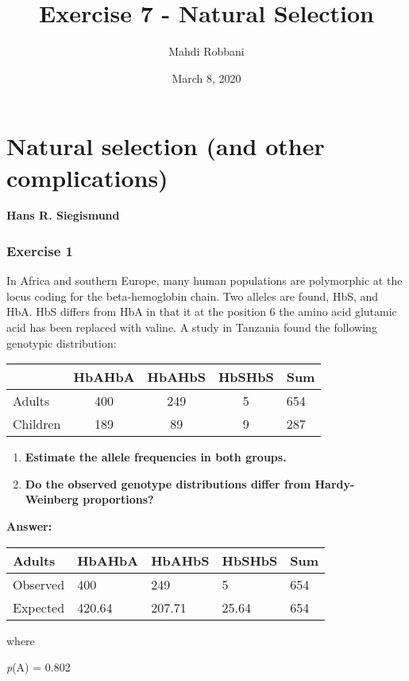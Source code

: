 \documentclass[]{article}
\title{Exercise 7 - Natural Selection}
\author{Mahdi Robbani}
\date{March 8, 2020}
\begin{document}
\maketitle

\hypertarget{natural-selection-and-other-complications}{%
\section{Natural selection (and other
complications)}\label{natural-selection-and-other-complications}}

\textbf{Hans R. Siegismund}

\hypertarget{exercise-1}{%
\subsubsection{Exercise 1}\label{exercise-1}}

In Africa and southern Europe, many human populations are polymorphic at
the locus coding for the beta-hemoglobin chain. Two alleles are found,
HbS, and HbA. HbS differs from HbA in that it at the position 6 the
amino acid glutamic acid has been replaced with valine. A study in
Tanzania found the following genotypic distribution:

\begin{longtable}[]{@{}lcccl@{}}
\toprule
& HbAHbA & HbAHbS & HbSHbS & Sum\tabularnewline
\midrule
\endhead
Adults & 400 & 249 & 5 & 654\tabularnewline
Children & 189 & 89 & 9 & 287\tabularnewline
\bottomrule
\end{longtable}

\begin{enumerate}
\def\labelenumi{\arabic{enumi})}
\item
  \textbf{Estimate the allele frequencies in both groups.}
\item
  \textbf{Do the observed genotype distributions differ from
  Hardy-Weinberg proportions?}
\end{enumerate}

\textbf{Answer:}

\begin{longtable}[]{@{}lllll@{}}
\toprule
Adults & HbAHbA & HbAHbS & HbSHbS & Sum\tabularnewline
\midrule
\endhead
Observed & 400 & 249 & 5 & 654\tabularnewline
Expected & 420.64 & 207.71 & 25.64 & 654\tabularnewline
\bottomrule
\end{longtable}

where

\emph{p}(A) = 0.802
\end{document}
